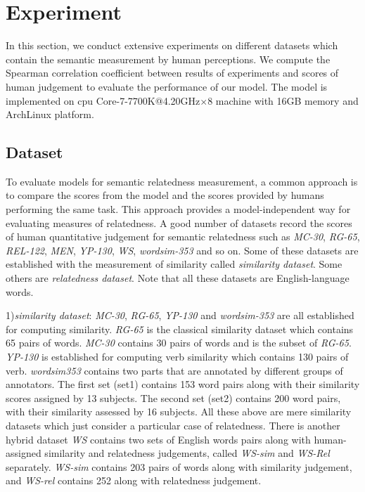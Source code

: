 \section{Experiment}
In this section, we conduct extensive experiments on different datasets which
contain the semantic measurement by human perceptions. We compute the Spearman
correlation coefficient between results of experiments and scores of human judgement
to evaluate the performance of our model. The model is implemented on 
cpu Core-7-7700K@4.20GHz$\times$8 machine with 16GB memory and ArchLinux platform.
 
\subsection{Dataset}
To evaluate models for semantic relatedness measurement, a common approach is to compare
the scores from the model and the scores provided by humans performing the same task.
This approach provides a model-independent way for evaluating measures of relatedness.
A good number of datasets record the scores of human quantitative judgement
for semantic relatedness such as \emph{MC-30}\cite{MC30/Miller02}, \emph{RG-65}\cite{RG65/RubensteinG65}, 
\emph{REL-122}\cite{acl/SzumlanskiGS13}, \emph{MEN}\cite{MEN/BruniTB14}, 
\emph{YP-130}\cite{YP130/Yang06verbsimilarity}, \emph{WS}\cite{ws/AgirreAHKPS09},
\emph{wordsim-353}\cite{wordsim353/FinkelsteinGMRSWR02}
and so on. Some of these datasets are established with the measurement of 
similarity called \emph{similarity dataset}. Some others are \emph{relatedness dataset}.
Note that all these datasets are English-language words.

1)\emph{similarity dataset}:
\emph{MC-30}, \emph{RG-65}, \emph{YP-130} and \emph{wordsim-353} are all established for computing similarity.
\emph{RG-65} is the classical similarity dataset which contains 65 pairs of words.
\emph{MC-30} contains 30 pairs of words and is the subset of \emph{RG-65}.
\emph{YP-130} is established for computing verb similarity which contains 130 pairs of verb.
\emph{wordsim353} contains two parts that are annotated by different groups of annotators.
The first set (set1) contains 153 word pairs along with their similarity scores assigned by 13 subjects. 
The second set (set2) contains 200 word pairs, with their similarity assessed by 16 subjects.
All these above are mere similarity datasets which just consider a particular case of relatedness.
There is another hybrid dataset \emph{WS} contains two sets of English words pairs along
with human-assigned similarity and relatedness judgements, called \emph{WS-sim} and \emph{WS-Rel} separately.
\emph{WS-sim} contains 203 pairs of words along with similarity judgement,
and \emph{WS-rel} contains 252 along with relatedness judgement.

